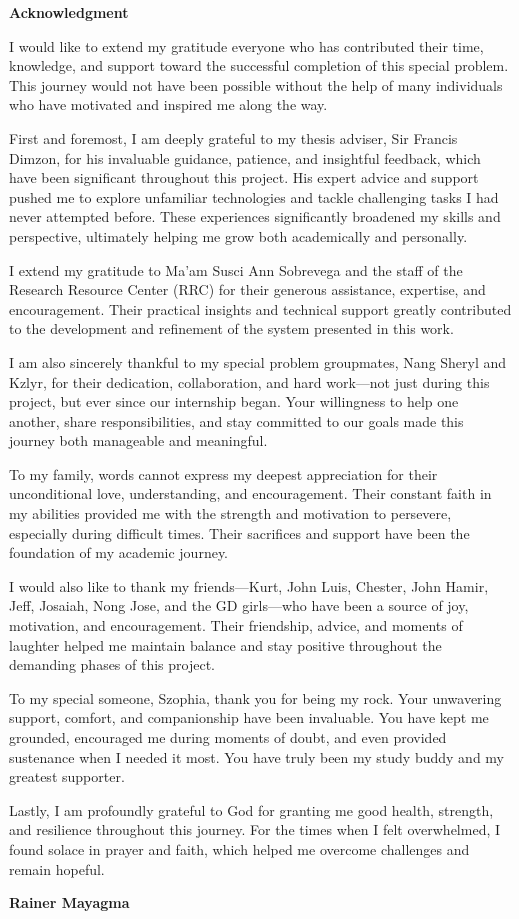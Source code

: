 \begin{center}
	\textbf{Acknowledgment}
\end{center}

I would like to extend my gratitude everyone who has contributed their time, knowledge, and support toward the successful completion of this special problem. This journey would not have been possible without the help of many individuals who have motivated and inspired me along the way.

First and foremost, I am deeply grateful to my thesis adviser, Sir Francis Dimzon, for his invaluable guidance, patience, and insightful feedback, which have been significant throughout this project. His expert advice and support pushed me to explore unfamiliar technologies and tackle challenging tasks I had never attempted before. These experiences significantly broadened my skills and perspective, ultimately helping me grow both academically and personally.

I extend my gratitude to Ma’am Susci Ann Sobrevega and the staff of the Research Resource Center (RRC) for their generous assistance, expertise, and encouragement. Their practical insights and technical support greatly contributed to the development and refinement of the system presented in this work.

I am also sincerely thankful to my special problem groupmates, Nang Sheryl and Kzlyr, for their dedication, collaboration, and hard work—not just during this project, but ever since our internship began. Your willingness to help one another, share responsibilities, and stay committed to our goals made this journey both manageable and meaningful.

To my family, words cannot express my deepest appreciation for their unconditional love, understanding, and encouragement. Their constant faith in my abilities provided me with the strength and motivation to persevere, especially during difficult times. Their sacrifices and support have been the foundation of my academic journey.

I would also like to thank my friends—Kurt, John Luis, Chester, John Hamir, Jeff, Josaiah, Nong Jose, and the GD girls—who have been a source of joy, motivation, and encouragement. Their friendship, advice, and moments of laughter helped me maintain balance and stay positive throughout the demanding phases of this project.

To my special someone, Szophia, thank you for being my rock. Your unwavering support, comfort, and companionship have been invaluable. You have kept me grounded, encouraged me during moments of doubt, and even provided sustenance when I needed it most. You have truly been my study buddy and my greatest supporter.

Lastly, I am profoundly grateful to God for granting me good health, strength, and resilience throughout this journey. For the times when I felt overwhelmed, I found solace in prayer and faith, which helped me overcome challenges and remain hopeful.

\vspace{0.5em}
\hfill \textbf{Rainer Mayagma}